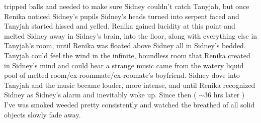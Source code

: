 \documentclass[12pt]{book}
\begin{document}
tripped balls and needed to make sure Sidney couldn't catch Tanyjah, but once Renika noticed Sidney's pupils Sidney's heads turned into serpent faced and Tanyjah started hissed and yelled. Renika gained lucidity at this point and melted Sidney away in Sidney's brain, into the floor, along with everything else in Tanyjah's room, until Renika was floated above Sidney all in Sidney's bedded. Tanyjah could feel the wind in the infinite, boundless room that Renika created in Sidney's mind and could hear a strange music came from the watery liquid pool of melted room/ex-roommate/ex-roomate's boyfriend. Sidney dove into Tanyjah and the music became louder, more intense, and until Renika recognized Sidney as Sidney's alarm and inevitably woke up. Since then ( $\sim$36 hrs later ) I've was smoked weeded pretty consistently and watched the breathed of all solid objects slowly fade away.
\end{document}
